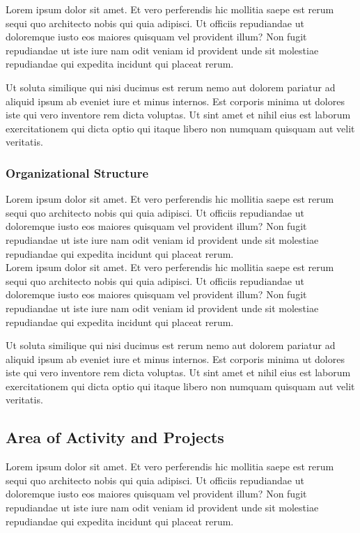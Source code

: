 \documentclass[12pt]{article}
\begin{document}
\noindent Lorem ipsum dolor sit amet. Et vero perferendis hic mollitia saepe est rerum sequi quo architecto nobis qui quia adipisci. Ut officiis repudiandae ut doloremque iusto eos maiores quisquam vel provident illum? Non fugit repudiandae ut iste iure nam odit veniam id provident unde sit molestiae repudiandae qui expedita incidunt qui placeat rerum.

Ut soluta similique qui nisi ducimus est rerum nemo aut dolorem pariatur ad aliquid ipsum ab eveniet iure et minus internos. Est corporis minima ut dolores iste qui vero inventore rem dicta voluptas. Ut sint amet et nihil eius est laborum exercitationem qui dicta optio qui itaque libero non numquam quisquam aut velit veritatis.\\

\subsubsection{Organizational Structure}

Lorem ipsum dolor sit amet. Et vero perferendis hic mollitia saepe est rerum sequi quo architecto nobis qui quia adipisci. Ut officiis repudiandae ut doloremque iusto eos maiores quisquam vel provident illum? Non fugit repudiandae ut iste iure nam odit veniam id provident unde sit molestiae repudiandae qui expedita incidunt qui placeat rerum.\\

\noindent Lorem ipsum dolor sit amet. Et vero perferendis hic mollitia saepe est rerum sequi quo architecto nobis qui quia adipisci. Ut officiis repudiandae ut doloremque iusto eos maiores quisquam vel provident illum? Non fugit repudiandae ut iste iure nam odit veniam id provident unde sit molestiae repudiandae qui expedita incidunt qui placeat rerum.

Ut soluta similique qui nisi ducimus est rerum nemo aut dolorem pariatur ad aliquid ipsum ab eveniet iure et minus internos. Est corporis minima ut dolores iste qui vero inventore rem dicta voluptas. Ut sint amet et nihil eius est laborum exercitationem qui dicta optio qui itaque libero non numquam quisquam aut velit veritatis.

\subsection{Area of Activity and Projects}

Lorem ipsum dolor sit amet. Et vero perferendis hic mollitia saepe est rerum sequi quo architecto nobis qui quia adipisci. Ut officiis repudiandae ut doloremque iusto eos maiores quisquam vel provident illum? Non fugit repudiandae ut iste iure nam odit veniam id provident unde sit molestiae repudiandae qui expedita incidunt qui placeat rerum.
\end{document}
